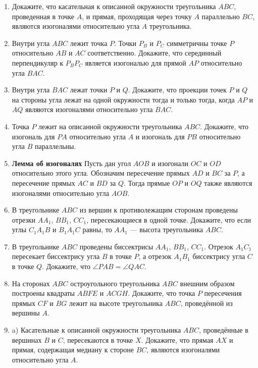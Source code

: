 \documentclass{article}
\begin{document}
\begin{enumerate}[label*=\protect\fbox{\arabic{enumi}}]

\item Докажите, что касательная к описанной окружности треугольника $ABC$, проведенная в точке $A$, и прямая, проходящая через точку $A$ параллельно $BC$, являются изогоналями относительно угла $A$ треугольника.

\item Внутри угла $ABC$ лежит точка $P$. Точки $P_B$ и $P_C$ симметричны точке $P$ относительно $AB$ и $AC$ соответственно. Докажите, что серединный перпендикуляр к $P_B P_C$ является изогональю для прямой $AP$ относительно угла $BAC$.

\item Внутри угла $BAC$ лежат точки $P$ и $Q$. Докажите, что проекции точек $P$ и $Q$ на стороны угла лежат на одной окружности тогда и только тогда, когда $AP$ и $AQ$ являются изогоналями относительно угла $BAC$.

\item Точка $P$ лежит на описанной окружности треугольника $ABC$. Докажите, что изогональ для $PA$ относительно угла $A$ и изогональ для $PB$ относительно угла $B$ параллельны.

\item \textbf{Лемма об изогоналях} Пусть дан угол $AOB$ и изогонали $OC$ и $OD$ относительно этого угла. Обозначим пересечение прямых $AD$ и $BC$ за $P$, а пересечение прямых $AC$ и $BD$ за $Q$. Тогда прямые $OP$ и $OQ$ также являются изогоналями относительно угла $AOB$.

\item В треугольнике $ABC$ из вершин к противолежащим сторонам проведены отрезки $AA_1$, $BB_1$, $CC_1$, пересекающиеся в одной точке. Докажите, что если углы $C_1A_1B$ и $B_1A_1C$ равны, то $AA_1$ — высота треугольника $ABC$.

\item В треугольнике $ABC$ проведены биссектрисы $AA_1$, $BB_1$, $CC_1$. Отрезок $A_1C_1$ пересекает биссектрису угла $B$ в точке $P$, а отрезок $A_1B_1$ биссектрису угла $C$ в точке $Q$. Докажите, что $\angle PAB = \angle QAC$.

\item На сторонах $ABC$ остроугольного треугольника $ABC$ внешним образом построены квадраты $ABFE$ и $ACGH$. Докажите, что точка $P$ пересечения прямых $CF$ и $BG$ лежит на высоте треугольника $ABC$, проведённой из вершины $A$.

\item a) Касательные к описанной окружности треугольника $ABC$, проведённые в вершинах $B$ и $C$, пересекаются в точке $X$. Докажите, что прямая $AX$ и прямая, содержащая медиану к стороне $BC$, являются изогоналями относительно угла $A$.


\end{enumerate}
\end{document}
